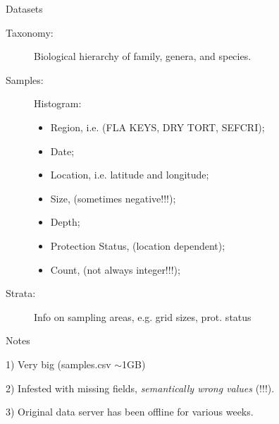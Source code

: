 \documentclass{beamer}
\begin{document}
\begin{frame}{Datasets}

  \begin{description}

  \item[Taxonomy:]  Biological hierarchy of family, genera, and species.

  \item[Samples:]  Histogram: \begin{itemize}

      \item Region, i.e. {\small (FLA KEYS, DRY TORT, SEFCRI)};

      \item Date;

      \item Location, i.e. latitude and longitude;

      \item Size, {\small (sometimes negative!!!)};

      \item Depth;

      \item Protection Status, {\small (location dependent)};

      \item Count, {\small (not always integer!!!)};

    \end{itemize}

  \item[Strata:]  {Info on sampling areas, e.g. grid sizes, prot. status}

  \end{description}

  \vspace{-.2cm}
  \begin{block}{Notes}

    1) Very big (samples.csv $\sim$1GB)
    
    2) Infested with missing fields, \emph{semantically wrong values} (!!!).

    3) Original data server has been offline for various weeks.

  \end{block}

\end{frame}
\end{document}
